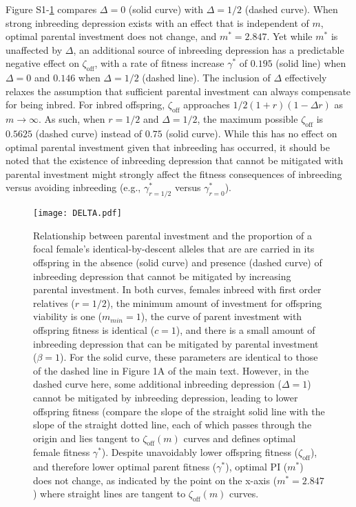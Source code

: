 \documentclass[12pt]{article}
\begin{document}
Figure S1-\ref{DELTA} compares $\Delta=0$ (solid curve) with $\Delta=1/2$ (dashed curve). When strong inbreeding depression exists with an effect that is independent of $m$, optimal parental investment does not change, and $m^{*}=2.847$. Yet while $m^{*}$ is unaffected by $\Delta$, an additional source of inbreeding depression has a predictable negative effect on $\zeta_{\textrm{off}}$, with a rate of fitness increase $\gamma^{*}$ of $0.195$ (solid line) when $\Delta=0$ and $0.146$ when $\Delta=1/2$ (dashed line). The inclusion of $\Delta$ effectively relaxes the assumption that sufficient parental investment can always compensate for being inbred. For inbred offspring, $\zeta_{\textrm{off}}$ approaches $1/2(1+r)(1 - \Delta r)$ as $m \to \infty$. As such, when $r=1/2$ and $\Delta=1/2$, the maximum possible $\zeta_{\textrm{off}}$ is $0.5625$ (dashed curve) instead of $0.75$ (solid curve). While this has no effect on optimal parental investment given that inbreeding has occurred, it should be noted that the existence of inbreeding depression that cannot be mitigated with parental investment might strongly affect the fitness consequences of inbreeding versus avoiding inbreeding (e.g., $\gamma^{*}_{r=1/2}$ versus $\gamma^{*}_{r=0}$).

\begin{figure}
\begin{center}				
\texttt{[image: DELTA.pdf]}
\end{center}
\caption{Relationship between parental investment and the proportion of a focal female's identical-by-descent alleles that are are carried in its offspring in the absence (solid curve) and presence (dashed curve) of inbreeding depression that cannot be mitigated by increasing parental investment. In both curves, females inbreed with first order relatives ($r=1/2$), the minimum amount of investment for offspring viability is one ($m_{min}=1$), the curve of parent investment with offspring fitness is identical ($c=1$), and there is a small amount of inbreeding depression that can be mitigated by parental investment ($\beta=1$). For the solid curve, these parameters are identical to those of the dashed line in Figure 1A of the main text. However, in the dashed curve here, some additional inbreeding depression ($\Delta=1$) cannot be mitigated by inbreeding depression, leading to lower offspring fitness (compare the slope of the straight solid line with the slope of the straight dotted line, each of which passes through the origin and lies tangent to $\zeta_{\textrm{off}}(m)$ curves and defines optimal female fitness $\gamma^{*}$). Despite unavoidably lower offspring fitness ($\zeta_{\textrm{off}}$), and therefore lower optimal parent fitness ($\gamma^{*}$), optimal PI ($m^{*}$) does not change, as indicated by the point on the x-axis ($m^{*}=2.847$) where straight lines are tangent to $\zeta_{\textrm{off}}(m)$ curves.}
\label{DELTA}
\end{figure}
\end{document}
